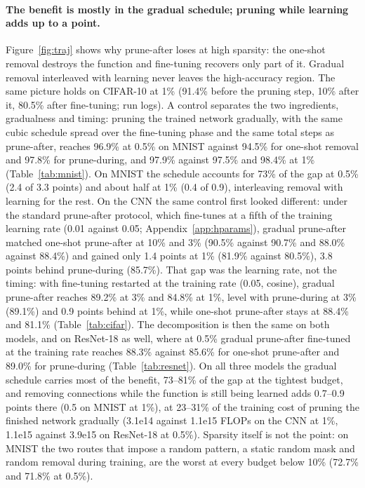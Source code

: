 \documentclass[11pt]{article}
\begin{document}
\paragraph{The benefit is mostly in the gradual schedule; pruning while learning adds up to a point.} Figure~\ref{fig:traj}
shows why
prune-after loses at high sparsity: the one-shot removal destroys the function and fine-tuning recovers only part of it.
Gradual removal interleaved with learning never leaves the high-accuracy region. The same picture holds on CIFAR-10 at 1\%
(91.4\% before the pruning step, 10\% after it, 80.5\% after fine-tuning; run logs). A control separates the two
ingredients, gradualness and timing: pruning the trained network gradually, with the same cubic schedule spread over the
fine-tuning phase and the same total steps as prune-after, reaches 96.9\% at 0.5\% on MNIST against 94.5\% for one-shot
removal and 97.8\% for prune-during, and 97.9\% against 97.5\% and 98.4\% at 1\% (Table~\ref{tab:mnist}). On MNIST the schedule
accounts for 73\% of the gap at 0.5\% (2.4 of 3.3 points) and about half at 1\% (0.4 of 0.9), interleaving removal
with learning for the rest. On the CNN the same control first looked different: under the standard prune-after protocol,
which fine-tunes at a fifth of the training learning rate (0.01 against 0.05; Appendix~\ref{app:hparams}), gradual
prune-after matched one-shot prune-after at 10\% and 3\% (90.5\% against 90.7\% and 88.0\% against 88.4\%) and gained
only 1.4 points at 1\% (81.9\% against 80.5\%), 3.8 points behind prune-during (85.7\%). That gap was the learning rate,
not the timing: with fine-tuning restarted at the training rate (0.05, cosine), gradual prune-after reaches 89.2\% at 3\%
and 84.8\% at 1\%, level with prune-during at 3\% (89.1\%) and 0.9 points behind at 1\%, while one-shot prune-after
stays at 88.4\% and 81.1\% (Table~\ref{tab:cifar}). The decomposition is then the same on both models, and on ResNet-18
as well, where at 0.5\% gradual prune-after fine-tuned at the training rate reaches 88.3\% against 85.6\% for one-shot
prune-after and 89.0\% for prune-during (Table~\ref{tab:resnet}). On all three models the gradual schedule carries most of
the benefit, 73--81\% of the gap at the tightest budget, and removing connections while the function is still being
learned adds 0.7--0.9 points there (0.5 on MNIST at 1\%), at 23--31\% of the training cost of pruning the finished network
gradually (3.1e14 against
1.1e15 FLOPs on the CNN at 1\%, 1.1e15 against 3.9e15 on ResNet-18 at 0.5\%). Sparsity itself is not
the point: on MNIST the two routes that impose a random
pattern, a static random mask and random removal during training, are the worst at every budget below 10\% (72.7\% and
71.8\% at 0.5\%).
\end{document}
